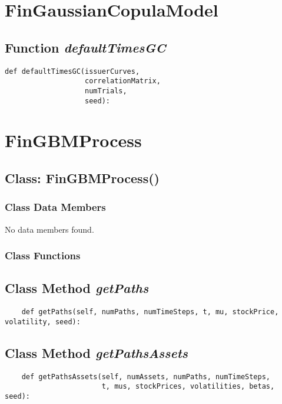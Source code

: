 \documentclass[twoside,11pt]{book}
\begin{document}
\newpage
\section{FinGaussianCopulaModel}

\subsection{Function {\it defaultTimesGC}}


\begin{lstlisting}
def defaultTimesGC(issuerCurves, 
                   correlationMatrix, 
                   numTrials, 
                   seed):
\end{lstlisting}

\newpage
\section{FinGBMProcess}

\subsection{Class: FinGBMProcess()}


\subsubsection{Class Data Members}
No data members found.

\subsubsection{Class Functions}

\subsection{Class Method {\it getPaths}}


\begin{lstlisting}
    def getPaths(self, numPaths, numTimeSteps, t, mu, stockPrice, volatility, seed):    
\end{lstlisting}

\subsection{Class Method {\it getPathsAssets}}


\begin{lstlisting}
    def getPathsAssets(self, numAssets, numPaths, numTimeSteps, 
                       t, mus, stockPrices, volatilities, betas, seed):    
\end{lstlisting}
\end{document}
